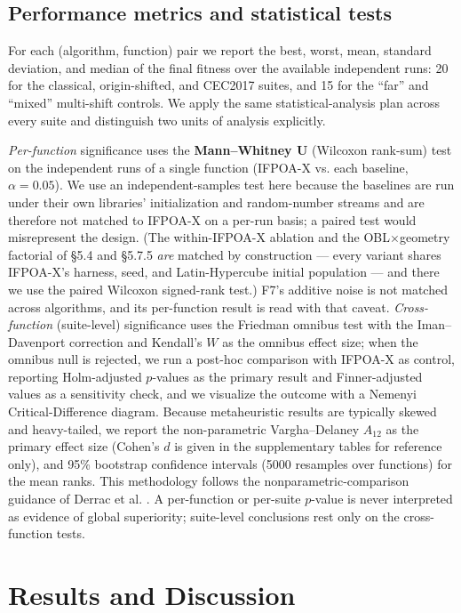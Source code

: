 \documentclass[preprint,12pt]{elsarticle}
\begin{document}
\subsection{Performance metrics and statistical tests}
\label{subsec4-5}
For each (algorithm, function) pair we report the best, worst, mean, standard deviation, and median of the final fitness over the available independent runs: 20 for the classical, origin-shifted, and CEC2017 suites, and 15 for the ``far'' and ``mixed'' multi-shift controls. We apply the same statistical-analysis plan across every suite and distinguish two units of analysis explicitly.

\emph{Per-function} significance uses the \textbf{Mann--Whitney U} (Wilcoxon rank-sum) test on the independent runs of a single function (IFPOA-X vs. each baseline, $\alpha = 0.05$). We use an independent-samples test here because the baselines are run under their own libraries' initialization and random-number streams and are therefore not matched to IFPOA-X on a per-run basis; a paired test would misrepresent the design. (The within-IFPOA-X ablation and the OBL$\times$geometry factorial of \S5.4 and \S5.7.5 \emph{are} matched by construction --- every variant shares IFPOA-X's harness, seed, and Latin-Hypercube initial population --- and there we use the paired Wilcoxon signed-rank test.) F7's additive noise is not matched across algorithms, and its per-function result is read with that caveat. \emph{Cross-function} (suite-level) significance uses the Friedman omnibus test with the Iman--Davenport correction and Kendall's $W$ as the omnibus effect size; when the omnibus null is rejected, we run a post-hoc comparison with IFPOA-X as control, reporting Holm-adjusted $p$-values as the primary result and Finner-adjusted values as a sensitivity check, and we visualize the outcome with a Nemenyi Critical-Difference diagram. Because metaheuristic results are typically skewed and heavy-tailed, we report the non-parametric Vargha--Delaney $A_{12}$ as the primary effect size (Cohen's $d$ is given in the supplementary tables for reference only), and 95\% bootstrap confidence intervals (5000 resamples over functions) for the mean ranks. This methodology follows the nonparametric-comparison guidance of Derrac et al. \cite{derrac2011practical}. A per-function or per-suite $p$-value is never interpreted as evidence of global superiority; suite-level conclusions rest only on the cross-function tests.


\section{Results and Discussion}
\label{sec5}
\end{document}
